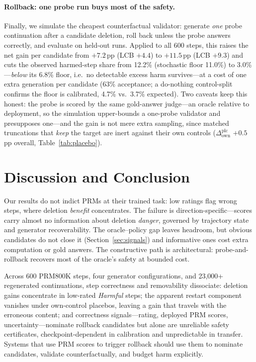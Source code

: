 \documentclass[11pt]{article}
\begin{document}
\paragraph{Rollback: one probe run buys most of the safety.}
Finally, we simulate the cheapest counterfactual validator: generate \emph{one} probe continuation after a candidate deletion, roll back unless the probe answers correctly, and evaluate on held-out runs. Applied to all 600 steps, this raises the net gain per candidate from $+7.2$\,pp (LCB $+4.4$) to $+11.5$\,pp (LCB $+9.3$) and cuts the observed harmed-step share from 12.2\% (stochastic floor 11.0\%) to 3.0\%---\emph{below} its 6.8\% floor, i.e.\ no detectable excess harm survives---at a cost of one extra generation per candidate (63\% acceptance; a do-nothing control-split confirms the floor is calibrated, 4.7\% vs.\ 3.7\% expected). Two caveats keep this honest: the probe is scored by the same gold-answer judge---an oracle relative to deployment, so the simulation upper-bounds a one-probe validator and presupposes one---and the gain is not mere extra sampling, since matched truncations that \emph{keep} the target are inert against their own controls ($\Delta^{\mathrm{plc}}_{\mathrm{own}}$ $+0.5$\,pp overall, Table~\ref{tab:placebo}).

\section{Discussion and Conclusion}
\label{sec:discussion}

Our results do not indict PRMs at their trained task: low ratings flag wrong steps, where deletion \emph{benefit} concentrates. The failure is direction-specific---scores carry almost no information about deletion \emph{danger}, governed by trajectory state and generator recoverability. The oracle--policy gap leaves headroom, but obvious candidates do not close it (Section~\ref{sec:signals}) and informative ones cost extra computation or gold answers. The constructive path is architectural: probe-and-rollback recovers most of the oracle's safety at bounded cost.

Across 600 PRM800K steps, four generator configurations, and 23{,}000+ regenerated continuations, step correctness and removability dissociate: deletion gains concentrate in low-rated \emph{Harmful} steps; the apparent restart component vanishes under own-control placebos, leaving a gain that travels with the erroneous content; and correctness signals---rating, deployed PRM scores, uncertainty---nominate rollback candidates but alone are unreliable safety certificates, checkpoint-dependent in calibration and unpredictable in transfer. Systems that use PRM scores to trigger rollback should use them to nominate candidates, validate counterfactually, and budget harm explicitly.
\end{document}

